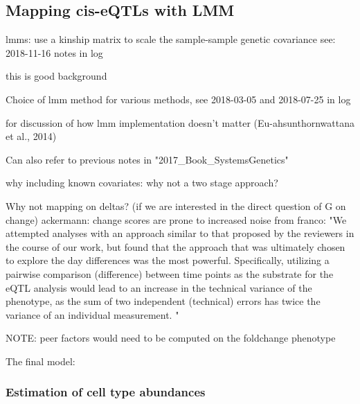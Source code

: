 \subsection{Mapping cis-eQTLs with LMM}

lmms: use a kinship matrix to scale the sample-sample genetic covariance
see: 2018-11-16 notes in log

this is good background

Choice of lmm method
for various methods, see 2018-03-05 and 2018-07-25 in log

for discussion of how lmm implementation doesn't matter (Eu-ahsunthornwattana et al., 2014)

Can also refer to previous notes in "2017\_Book\_SystemsGenetics"

why including known covariates: why not a two stage approach?

Why not mapping on deltas? (if we are interested in the direct question of G on change)
    ackermann: change scores are prone to increased noise
    from franco: "We attempted analyses with an approach similar to that proposed by the reviewers in the course of our work, but found that the approach that was ultimately chosen to explore the day differences was the most powerful. Specifically, utilizing a pairwise comparison (difference) between time points as the substrate for the eQTL analysis would lead to an increase in the technical variance of the phenotype, as the sum of two independent (technical) errors has twice the variance of an individual measurement. "

    NOTE: peer factors would need to be computed on the foldchange phenotype


The final model:

\subsubsection{Estimation of cell type abundances}

